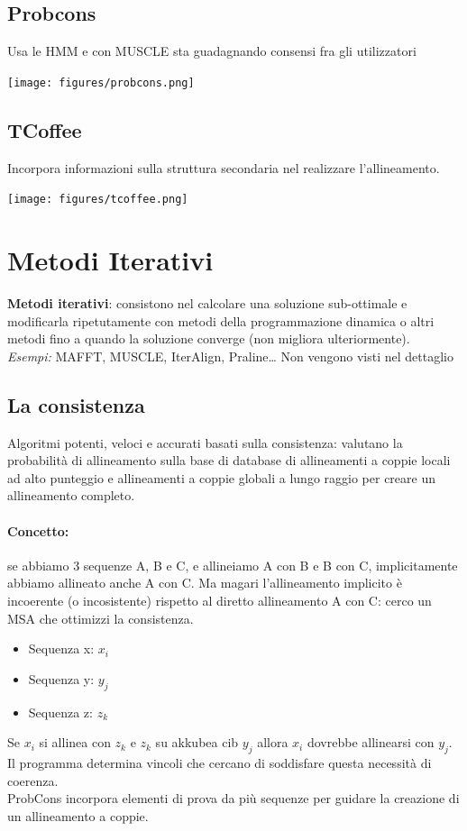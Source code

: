 \documentclass{article}
\begin{document}
\subsection{Probcons}
Usa le HMM e con MUSCLE sta guadagnando consensi fra
gli utilizzatori
\begin{center}
    \texttt{[image: figures/probcons.png]}
\end{center}
\subsection{TCoffee}
Incorpora informazioni sulla struttura secondaria nel
realizzare l'allineamento.
\begin{center}
    \texttt{[image: figures/tcoffee.png]}
\end{center}
\section{Metodi Iterativi}
\textbf{Metodi iterativi}: consistono nel calcolare una
soluzione sub-ottimale e modificarla ripetutamente
con metodi della programmazione dinamica o altri
metodi fino a quando la soluzione converge (non
migliora ulteriormente).\\
\textit{Esempi:} MAFFT, MUSCLE, IterAlign, Praline\dots
Non vengono visti nel dettaglio
\subsection{La consistenza} Algoritmi potenti, veloci e accurati basati sulla consistenza:
valutano la probabilità di allineamento sulla base di
database di allineamenti a coppie locali ad alto punteggio e
allineamenti a coppie globali a lungo raggio per creare un
allineamento completo.
\paragraph{Concetto:} se abbiamo 3 sequenze A, B e C, e allineiamo A
con B e B con C, implicitamente abbiamo allineato anche A
con C. Ma magari l'allineamento implicito è incoerente (o
incosistente) rispetto al diretto allineamento A con C: cerco
un MSA che ottimizzi la consistenza.
\begin{itemize}
    \item Sequenza x: $x_{i}$
    \item Sequenza y: $y_{j}$
    \item Sequenza z: $z_{k}$
\end{itemize}
Se $x_{i}$ si allinea con $z_{k}$ e $z_{k}$ su akkubea cib $y_{j}$
allora $x_{i}$ dovrebbe allinearsi con $y_{j}$. Il programma
determina vincoli che cercano di soddisfare questa
necessità di coerenza.\\
ProbCons incorpora elementi di prova da più sequenze
per guidare la creazione di un allineamento a coppie.
\end{document}
